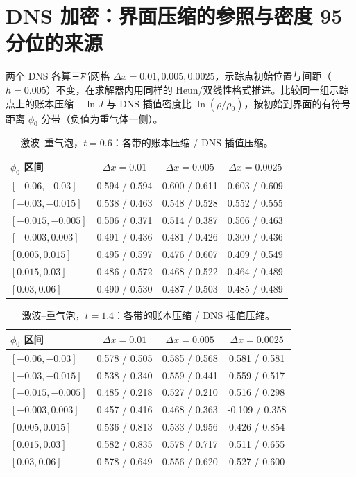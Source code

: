 \section{DNS 加密：界面压缩的参照与密度 95 分位的来源}\label{pB:sec:dns}
两个 DNS 各算三档网格 $\Delta x=0.01,0.005,0.0025$，示踪点初始位置与间距（$h=0.005$）不变，在求解器内用同样的 Heun/双线性格式推进。比较同一组示踪点上的账本压缩 $-\ln J$ 与 DNS 插值密度比 $\ln(\rho/\rho_0)$，按初始到界面的有符号距离 $\phi_0$ 分带（负值为重气体一侧）。
\begin{table}[!htbp]\centering\small\caption{激波–重气泡，$t=0.6$：各带的账本压缩 / DNS 插值压缩。}
\begin{tabular}{lccc}\toprule
$\phi_0$ 区间 & $\Delta x=0.01$ & $\Delta x=0.005$ & $\Delta x=0.0025$\\\midrule
$[-0.06,-0.03]$ & 0.594 / 0.594 & 0.600 / 0.611 & 0.603 / 0.609\\
$[-0.03,-0.015]$ & 0.538 / 0.463 & 0.548 / 0.528 & 0.552 / 0.555\\
$[-0.015,-0.005]$ & 0.506 / 0.371 & 0.514 / 0.387 & 0.506 / 0.463\\
$[-0.003,0.003]$ & 0.491 / 0.436 & 0.481 / 0.426 & 0.300 / 0.436\\
$[0.005,0.015]$ & 0.495 / 0.597 & 0.476 / 0.607 & 0.409 / 0.549\\
$[0.015,0.03]$ & 0.486 / 0.572 & 0.468 / 0.522 & 0.464 / 0.489\\
$[0.03,0.06]$ & 0.490 / 0.530 & 0.487 / 0.503 & 0.485 / 0.489\\
\bottomrule\end{tabular}\end{table}
\begin{table}[!htbp]\centering\small\caption{激波–重气泡，$t=1.4$：各带的账本压缩 / DNS 插值压缩。}
\begin{tabular}{lccc}\toprule
$\phi_0$ 区间 & $\Delta x=0.01$ & $\Delta x=0.005$ & $\Delta x=0.0025$\\\midrule
$[-0.06,-0.03]$ & 0.578 / 0.505 & 0.585 / 0.568 & 0.581 / 0.581\\
$[-0.03,-0.015]$ & 0.538 / 0.340 & 0.559 / 0.441 & 0.559 / 0.517\\
$[-0.015,-0.005]$ & 0.485 / 0.218 & 0.527 / 0.210 & 0.516 / 0.298\\
$[-0.003,0.003]$ & 0.457 / 0.416 & 0.468 / 0.363 & -0.109 / 0.358\\
$[0.005,0.015]$ & 0.536 / 0.813 & 0.533 / 0.956 & 0.426 / 0.854\\
$[0.015,0.03]$ & 0.582 / 0.835 & 0.578 / 0.717 & 0.511 / 0.655\\
$[0.03,0.06]$ & 0.578 / 0.649 & 0.556 / 0.620 & 0.527 / 0.600\\
\bottomrule\end{tabular}\end{table}
